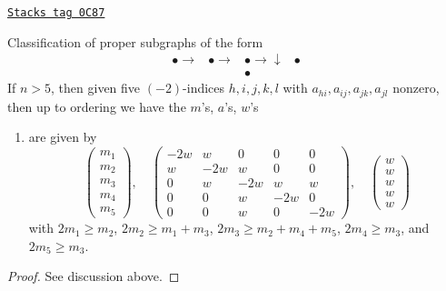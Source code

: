 \begin{lemma}[D5]
\label{models-lemma-D5}
\href{https://stacks.math.columbia.edu/tag/0C87}{\texttt{Stacks tag 0C87}}

Classification of proper subgraphs of the form
$$
\begin{array}{cccc}\bullet \longrightarrow & \bullet \longrightarrow & \bullet \longrightarrow\downarrow & \bullet \\  &  & \bullet & \end{array}
$$
If $n > 5$, then given five $(-2)$-indices $h, i, j, k, l$
with $a_{hi}, a_{ij}, a_{jk}, a_{jl}$ nonzero, then up
to ordering we have the $m$'s, $a$'s, $w$'s
\begin{enumerate}
\item
\label{models-item-D5}
are given by
$$
\left(
\begin{matrix}
m_1 \\
m_2 \\
m_3 \\
m_4 \\
m_5
\end{matrix}
\right),
\quad
\left(
\begin{matrix}
-2w & w & 0 & 0 & 0 \\
w & -2w & w & 0 & 0 \\
0 & w & -2w & w & w \\
0 & 0 & w & -2w & 0 \\
0 & 0 & w & 0 & -2w
\end{matrix}
\right),
\quad
\left(
\begin{matrix}
w \\
w \\
w \\
w \\
w
\end{matrix}
\right)
$$
with $2m_1 \geq m_2$, $2m_2 \geq m_1 + m_3$, $2m_3 \geq m_2 + m_4 + m_5$,
$2m_4 \geq m_3$, and $2m_5 \geq m_3$.
\end{enumerate}
\end{lemma}

\begin{proof}
See discussion above.
\end{proof}


